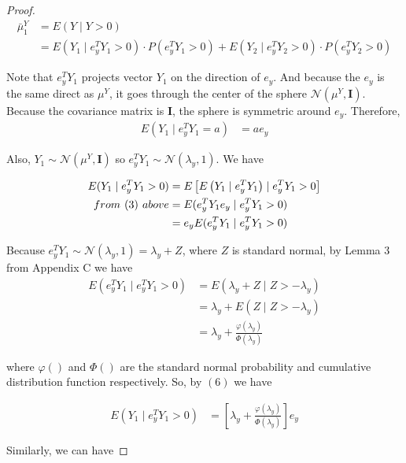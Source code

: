 \documentclass[11pt]{article}
\begin{document}
\begin{proof}
\begin{align}
\bar{\mu}^Y_1 & = E(Y \mid Y>0) \\
 &= E(Y_1 \mid e^T_y Y_1 > 0) \cdot P(e^T_y Y_1 >0) +E(Y_2 \mid e^T_y Y_2 > 0) \cdot P(e^T_y Y_2 >0)
\end{align}

Note that $e^T_y Y_1$ projects vector $Y_1$ on the direction of $e_y$. And because the $e_y$ is the same direct as $\mu^Y$, it goes through the center of the sphere $\mathcal{N}\left( \mu^Y, \mathbf{I}\right)$. Because the covariance matrix is $\mathbf{I}$, the sphere is symmetric around $e_y$. Therefore, 
\begin{align}
E(Y_1 \mid e^T_y Y_1 = a ) & = a e_y
\end{align}

Also, $Y_1 \sim \mathcal{N}\left( \mu^Y, \mathbf{I}\right)$ so $e^T_y Y_1 \sim \mathcal{N}\left( \lambda_y, 1\right)$. We have

\begin{align}
E(Y_1 \mid e^T_y Y_1 > 0)  & = E \left[  E\left(  Y_1 \mid e^T_y Y_1  \right) \mid e^T_y Y_1 > 0  \right] \\
 from \hspace{0.05in} (3) \hspace{0.05in} above	& =  E( e^T_y Y_1 e_y  \mid e^T_y Y_1 > 0  )  \\ 
	& = e_y E( e^T_y Y_1 \mid e^T_y Y_1 > 0  ) 
\end{align}

Because $e^T_y Y_1 \sim \mathcal{N}\left( \lambda_y, 1\right)  = \lambda_y + Z$, where $Z$ is standard normal, by Lemma $3$ from Appendix C we have 
\begin{align}
E( e^T_y Y_1 \mid e^T_y Y_1 > 0  ) &= E(\lambda_y +  Z \mid Z > -  \lambda_y )  \\
 &= \lambda_y + E(Z \mid Z > -  \lambda_y ) \\
 &= \lambda_y + \frac{\varphi(\lambda_y)}{\Phi(\lambda_y)}
\end{align}

 where $\varphi()$ and $\Phi()$ are the standard normal probability and cumulative distribution function respectively. So, by $(6)$ we have

\begin{align}
E(Y_1 \mid e^T_y Y_1 > 0)  &= \left[ \lambda_y + \frac{\varphi(\lambda_y)}{\Phi(\lambda_y)}  \right] e_y
\end{align}

Similarly, we can have


\end{proof}
\end{document}
